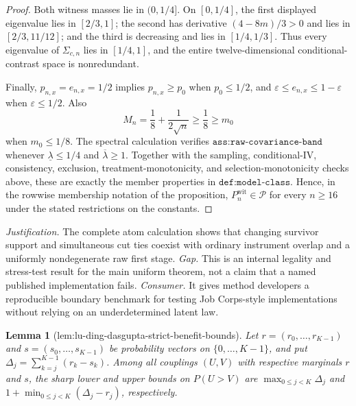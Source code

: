 \documentclass{article}
\newtheorem{lemma}{Lemma}
\begin{document}
\begin{proof}
Both witness masses lie in \((0,1/4]\). On \([0,1/4]\), the first displayed eigenvalue lies in \([2/3,1]\); the second has derivative \((4-8m)/3>0\) and lies in \([2/3,11/12]\); and the third is decreasing and lies in \([1/4,1/3]\). Thus every eigenvalue of \(\Sigma_{c,n}\) lies in \([1/4,1]\), and the entire twelve-dimensional conditional-contrast space is nonredundant.

Finally, \(p_{n,x}=e_{n,x}=1/2\) implies \(p_{n,x}\geq p_0\) when \(p_0\leq1/2\), and \(\varepsilon\leq e_{n,x}\leq1-\varepsilon\) when \(\varepsilon\leq1/2\). Also
\[
M_n=\frac18+\frac1{2\sqrt n}\geq\frac18\geq m_0
\]
when \(m_0\leq1/8\). The spectral calculation verifies \(\texttt{ass:raw-covariance-band}\) whenever \(\underline\lambda\leq1/4\) and \(\overline\lambda\geq1\). Together with the sampling, conditional-IV, consistency, exclusion, treatment-monotonicity, and selection-monotonicity checks above, these are exactly the member properties in \(\texttt{def:model-class}\). Hence, in the rowwise membership notation of the proposition, \(P_n^{\mathrm{wit}}\in\mathcal P\) for every \(n\geq16\) under the stated restrictions on the constants.
\end{proof}
\par\smallskip\noindent \textit{Justification.} The complete atom calculation shows that changing survivor support and simultaneous cut ties coexist with ordinary instrument overlap and a uniformly nondegenerate raw first stage. \textit{Gap.} This is an internal legality and stress-test result for the main uniform theorem, not a claim that a named published implementation fails. \textit{Consumer.} It gives method developers a reproducible boundary benchmark for testing Job Corps-style implementations without relying on an underdetermined latent law.

\begin{lemma}[lem:lu-ding-dasgupta-strict-benefit-bounds]\label{lem:lu-ding-dasgupta-strict-benefit-bounds}
Let \(r=(r_0,\ldots,r_{K-1})\) and \(s=(s_0,\ldots,s_{K-1})\) be probability vectors on \(\{0,\ldots,K-1\}\), and put \(\Delta_j=\sum_{k=j}^{K-1}(r_k-s_k)\). Among all couplings \((U,V)\) with respective marginals \(r\) and \(s\), the sharp lower and upper bounds on \(P(U>V)\) are \(\max_{0\le j<K}\Delta_j\) and \(1+\min_{0\le j<K}(\Delta_j-r_j)\), respectively.
\end{lemma}
\end{document}
